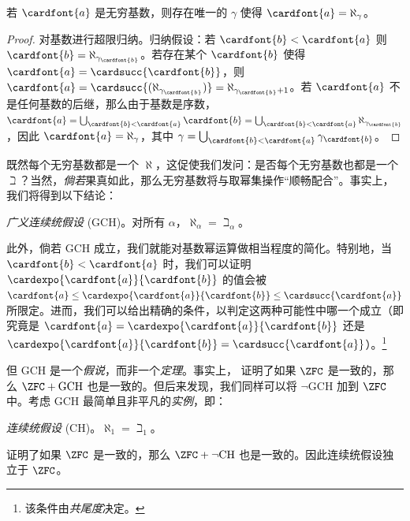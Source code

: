 \documentclass[../../../include/open-logic-section]{subfiles}
\begin{document}
\begin{prop}
若 $\cardfont{a}$ 是无穷基数，则存在唯一的 $\gamma$ 使得 $\cardfont{a} = \aleph_\gamma$。
\end{prop}

\begin{proof}
对基数进行超限归纳。归纳假设：若 $\cardfont{b} < \cardfont{a}$ 则 $\cardfont{b} =
\aleph_{\gamma_{\cardfont{b}}}$。若存在某个 $\cardfont{b}$ 使得 $\cardfont{a} =
\cardsucc{\cardfont{b}}$，则 $\cardfont{a} = \cardsucc{(\aleph_{\gamma_{\cardfont{b}}})}= \aleph_{\gamma_{\cardfont{b}}+1}$。若 $\cardfont{a}$ 不是任何基数的后继，那么由于基数是序数，$\cardfont{a} = \bigcup_{\cardfont{b} < \cardfont{a}} \cardfont{b} =
\bigcup_{\cardfont{b} < \cardfont{a}}{\aleph_{\gamma_{\cardfont{b}}}}$，因此 $\cardfont{a} = \aleph_\gamma$，其中 $\gamma =
\bigcup_{\cardfont{b} < \cardfont{a}}\gamma_{\cardfont{b}}$。
\end{proof}

既然每个无穷基数都是一个 $\aleph$，这促使我们发问：是否每个无穷基数也都是一个~$\beth$？当然，\emph{倘若}果真如此，那么无穷基数将与取幂集操作“顺畅配合”。事实上，我们将得到以下结论：

\begin{defish}
\emph{广义连续统假设} (GCH)。对所有 $\alpha$，$\aleph_\alpha  = \beth_\alpha$。
\end{defish}

此外，倘若 GCH 成立，我们就能对基数幂运算做相当程度的简化。特别地，当 $\cardfont{b} < \cardfont{a}$ 时，我们可以证明 $\cardexpo{\cardfont{a}}{\cardfont{b}}$ 的值会被 $\cardfont{a}\leq \cardexpo{\cardfont{a}}{\cardfont{b}} \leq
\cardsucc{\cardfont{a}}$ 所限定。进而，我们可以给出精确的条件，以判定这两种可能性中哪一个成立（即究竟是 $\cardfont{a} = \cardexpo{\cardfont{a}}{\cardfont{b}}$ 还是 $\cardexpo{\cardfont{a}}{\cardfont{b}} =
\cardsucc{\cardfont{a}}$）。\footnote{该条件由\emph{共尾度}决定。}

但 GCH 是一个\emph{假说}，而非一个\emph{定理}。事实上，\citet{Godel1938} 证明了如果 $\ZFC$ 是一致的，那么 $\ZFC + \text{GCH}$ 也是一致的。但后来发现，我们同样可以将 $\lnot$GCH 加到 $\ZFC$ 中。考虑 GCH 最简单且非平凡的\emph{实例}，即：

\begin{defish}
\emph{连续统假设} (CH)。$\aleph_1 = \beth_1$。
\end{defish}

\citet{Cohen1963} 证明了如果 $\ZFC$ 是一致的，那么 $\ZFC + \lnot\text{CH}$ 也是一致的。因此连续统假设独立于 $\ZFC$。
\end{document}
